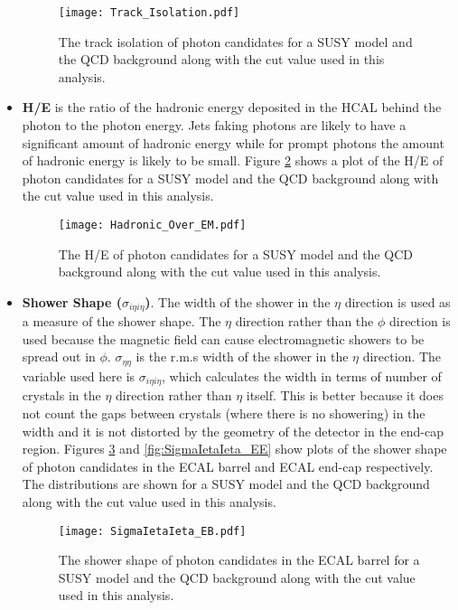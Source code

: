 \begin{itemize}
\begin{figure}
\begin{center}
\texttt{[image: Track\_Isolation.pdf]}
\end{center}
\caption{The track isolation of photon candidates for a SUSY model and the QCD 
background along with the cut value used in this analysis.}
\label{fig:Track_Isolation}
\end{figure}

\item {\bf H/E} is the ratio of the hadronic energy deposited in the HCAL behind
the photon to the photon energy. Jets faking photons are likely to have a 
significant amount of hadronic energy while for prompt photons the amount of 
hadronic energy is likely to be small. Figure \ref{fig:Hadronic_Over_EM} shows a
plot of the H/E of photon candidates for a SUSY model and the QCD background 
along with the cut value used in this analysis.

\begin{figure}
\begin{center}
\texttt{[image: Hadronic\_Over\_EM.pdf]}
\end{center}
\caption{The H/E of photon candidates for a SUSY model and the QCD background 
along with the cut value used in this analysis.}
\label{fig:Hadronic_Over_EM}
\end{figure}

\item {\bf Shower Shape ($\sigma_{i\eta i\eta}$)}. The width of the shower in 
the $\eta$ direction is used as a measure of the shower shape. The $\eta$ 
direction rather than the $\phi$ direction is used because the magnetic field 
can cause electromagnetic showers to be spread out in $\phi$. 
$\sigma_{\eta\eta}$ is the r.m.s width of the shower in the $\eta$ direction. 
The variable used here is $\sigma_{i\eta i\eta}$, which calculates the width in 
terms of number of crystals in the $\eta$ direction rather than $\eta$ itself. 
This is better because it does not count the gaps between crystals (where there 
is no showering) in the width and it is not distorted by the geometry of the 
detector in the end-cap region. Figures \ref{fig:SigmaIetaIeta_EB} and
\ref{fig:SigmaIetaIeta_EE} show plots of the shower shape of photon candidates 
in the ECAL barrel and ECAL end-cap respectively. The distributions are shown 
for a SUSY model and the QCD background along with the cut value used in this 
analysis.

\begin{figure}
\begin{center}
\texttt{[image: SigmaIetaIeta\_EB.pdf]}
\end{center}
\caption{The shower shape of photon candidates in the ECAL barrel for a SUSY 
model and the QCD background along with the cut value used in this analysis.} 
\label{fig:SigmaIetaIeta_EB}
\end{figure}


\end{itemize}
